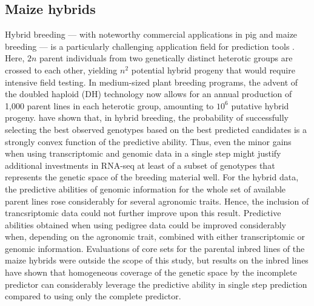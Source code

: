 \documentclass[12pt,titlepage]{article}
\begin{document}
\subsection{Maize hybrids}
Hybrid breeding --- with noteworthy commercial applications in pig
\cite{Xiang2016,Tusell2016} and maize breeding \cite{TheRoyalSociety2009} --- 
is a particularly challenging application field for prediction tools 
\cite{Kadam2016}.
Here, $2n$ parent individuals from two genetically distinct heterotic groups are
crossed to each other, yielding $n^{2}$ potential hybrid progeny that would
require intensive field testing.
In medium-sized plant breeding programs, the advent of the doubled haploid (DH) 
technology \cite{Wedzony2009} now allows for an annual production of 1,000 
parent lines in each heterotic group, amounting to $10^{6}$ putative hybrid
progeny.
 have shown that, in hybrid breeding, the probability 
of successfully selecting the best observed genotypes based on the best 
predicted candidates is a strongly convex function of the predictive ability.
Thus, even the minor gains when using transcriptomic and genomic data in a
single step might justify additional investments in RNA-seq at least of a
subset of genotypes that represents the genetic space of the breeding 
material well.
For the hybrid data, the predictive abilities of genomic information
for the whole set of available parent lines rose considerably for several
agronomic traits.
Hence, the inclusion of trancsriptomic data could not further improve upon
this result.
Predictive abilities obtained when using pedigree data could be 
improved considerably when, depending on the agronomic trait, combined with 
either transcriptomic or genomic information.
Evaluations of core sets for the parental inbred lines of the maize hybrids were 
outside the scope of this study, but results on the inbred lines have shown that 
homogeneous coverage of the genetic space by the incomplete predictor can 
considerably leverage the predictive ability in single step prediction compared 
to using only the complete predictor.
\end{document}
